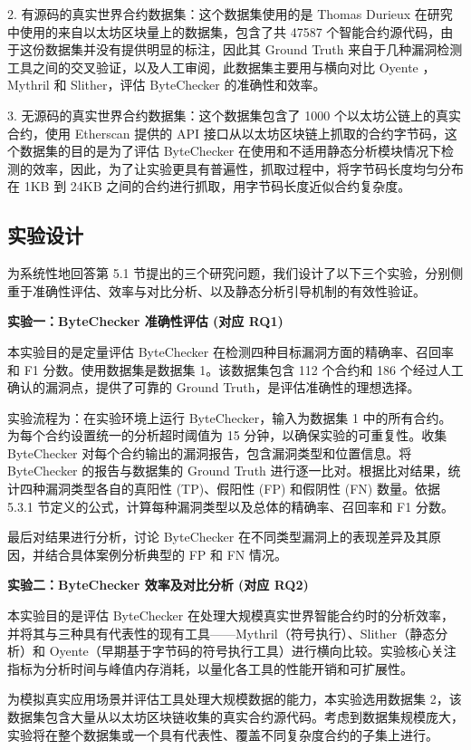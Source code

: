 \documentclass[print, master, vlined, timesmath]{DissertUESTC}
\begin{document}
2. 有源码的真实世界合约数据集：这个数据集使用的是 Thomas Durieux 在研究中使用的来自以太坊区块量上的数据集，包含了共 47587 个智能合约源代码，由于这份数据集并没有提供明显的标注，因此其 Ground Truth 来自于几种漏洞检测工具之间的交叉验证，以及人工审阅，此数据集主要用与横向对比 Oyente ， Mythril 和 Slither，评估 ByteChecker 的准确性和效率。

3. 无源码的真实世界合约数据集：这个数据集包含了 1000 个以太坊公链上的真实合约，使用 Etherscan 提供的 API 接口从以太坊区块链上抓取的合约字节码，这个数据集的目的是为了评估 ByteChecker 在使用和不适用静态分析模块情况下检测的效率，因此，为了让实验更具有普遍性，抓取过程中，将字节码长度均匀分布在 1KB 到 24KB 之间的合约进行抓取，用字节码长度近似合约复杂度。
\subsection{实验设计}

为系统性地回答第 5.1 节提出的三个研究问题，我们设计了以下三个实验，分别侧重于准确性评估、效率与对比分析、以及静态分析引导机制的有效性验证。

\textbf{实验一：ByteChecker 准确性评估 (对应 RQ1)}

本实验目的是定量评估 ByteChecker 在检测四种目标漏洞方面的精确率、召回率和 F1 分数。使用数据集是数据集 1。该数据集包含 112 个合约和 186 个经过人工确认的漏洞点，提供了可靠的 Ground Truth，是评估准确性的理想选择。

实验流程为：在实验环境上运行 ByteChecker，输入为数据集 1 中的所有合约。为每个合约设置统一的分析超时阈值为 15 分钟，以确保实验的可重复性。收集 ByteChecker 对每个合约输出的漏洞报告，包含漏洞类型和位置信息。将 ByteChecker 的报告与数据集的 Ground Truth 进行逐一比对。根据比对结果，统计四种漏洞类型各自的真阳性 (TP)、假阳性 (FP) 和假阴性 (FN) 数量。依据 5.3.1 节定义的公式，计算每种漏洞类型以及总体的精确率、召回率和 F1 分数。

最后对结果进行分析，讨论 ByteChecker 在不同类型漏洞上的表现差异及其原因，并结合具体案例分析典型的 FP 和 FN 情况。

\textbf{实验二：ByteChecker 效率及对比分析 (对应 RQ2)}

本实验目的是评估 ByteChecker 在处理大规模真实世界智能合约时的分析效率，并将其与三种具有代表性的现有工具——Mythril（符号执行）、Slither（静态分析）和 Oyente（早期基于字节码的符号执行工具）进行横向比较。实验核心关注指标为分析时间与峰值内存消耗，以量化各工具的性能开销和可扩展性。

为模拟真实应用场景并评估工具处理大规模数据的能力，本实验选用数据集 2，该数据集包含大量从以太坊区块链收集的真实合约源代码。考虑到数据集规模庞大，实验将在整个数据集或一个具有代表性、覆盖不同复杂度合约的子集上进行。
\end{document}

